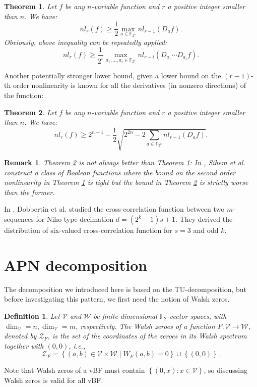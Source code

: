 \documentclass[8pt,oneside]{article}
\newcommand{\0}{\textbf{0}}
\newcommand{\1}{\textbf{1}}
\newcommand{\F}{\mathbb{F}}
\newtheorem{theorem}{Theorem}
\newtheorem{definition}{Definition}
\newtheorem{remark}{Remark}
\begin{document}
    \begin{theorem}\label{TH:NL_onederivate}
        Let $f$ be any $ n $-variable function and $ r $ a positive integer smaller than $ n $. We have:
        \[nl_r(f)\ge\frac{1}{2}\max_{a\in\F_{2^n}}nl_{r-1}(D_af).\]
        Obviously, above inequality can be repeatedly applied: 
        \[nl_r(f)\ge \frac{1}{2^i}\max_{a_1,\dots,a_i\in\F_{2^n}}nl_{r-i}(D_{a_1}\cdots D_{a_i}f).\]
    \end{theorem}
    Another potentially stronger lower bound, given a lower bound on the $ (r-1) $-th order nonlinearity is 
    known for all the derivatives (in nonzero directions) of the function:
    \begin{theorem}\label{TH:NL_allderivates}
        Let $f$ be any $ n $-variable function and $ r $ a positive integer smaller than $ n $. We have:
        \[nl_r(f) \ge 2^{n-1} -\frac{1}{2}\sqrt{2^{2n}-2\sum_{a\in\F_{2^n}}nl_{r-1}(D_af)}.\]
    \end{theorem}
    \begin{remark}
        {\color{red}Theorem \ref{TH:NL_allderivates} is not always better than Theorem \ref{TH:NL_onederivate}}: 
        In \cite{SihemGJDK2017lowerbound_nl_2_notalwaysbetter}, Sihem et al. construct a class of Boolean functions where the bound on the second order nonlinearity in Theorem \ref{TH:NL_onederivate} is tight but the bound in Theorem \ref{TH:NL_allderivates} is strictly worse than the former. 
    \end{remark}
    
    In \cite{dobbertin2006niho_dickson_kloosterman}, Dobbertin et al. studied the cross-correlation function between two 
    $ m $-sequences for Niho type decimation $ d=(2^k-1)s+1 $. 
    They derived the distribution of six-valued cross-correlation function for $ s=3 $ and odd $ k $. 
    
\section{APN decomposition}
    The decomposition \cite{BeierleCLP2022ninebitAPNpermutation_error} we introduced here
    is based on the TU-decomposition, but before investigating this pattern, we first need the notion of Walsh zeros.
    \begin{definition}
        Let $ \mathcal{V} $ and $ \mathcal{W} $  be finite-dimensional $\F_2 $-vector spaces, 
        with $ \dim_{\mathcal{V}}=n,\dim_{\mathcal{V}}=m $, respectively. 
        The Walsh zeroes of a function $ F : \mathcal{V}\rightarrow \mathcal{W} $, denoted by $ \mathcal{Z}_F $, 
        is the set of the coordinates of the zeroes in its Walsh spectrum together with $ (0, 0) $, i.e.,
        \[\mathcal{Z}_F=\left\{ (a,b)\in\mathcal{V}\times\mathcal{W}\mid W_F(a,b)=0 \right\}\cup\left\{ (0,0) \right\}.\]
    \end{definition}
    Note that Walsh zeros of a vBF must contain $ \left\{ (0,x):x\in\mathcal{V} \right\} $, so discussing Walsh zeros 
    is valid for all vBF. 
    
\end{document}

